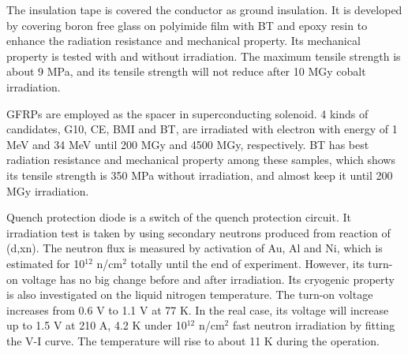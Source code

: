 \documentclass[a4paper, 10pt, twocolumn]{article}
\begin{document}
The insulation tape is covered the conductor as ground insulation.
It is developed by covering boron free glass on polyimide film with BT and epoxy resin to enhance the radiation resistance and mechanical property.
Its mechanical property is tested with and without irradiation.
The maximum tensile strength is about 9 MPa, and its tensile strength will not reduce after 10 MGy cobalt irradiation.

GFRPs are employed as the spacer in superconducting solenoid.
4 kinds of candidates, G10, CE, BMI and BT, are irradiated with electron with energy of 1 MeV and 34 MeV until 200 MGy and 4500 MGy, respectively.
BT has best radiation resistance and mechanical property among these samples, which shows its tensile strength is 350 MPa without irradiation, and almost keep it until 200 MGy irradiation.

Quench protection diode is a switch of the quench protection circuit.
It irradiation test is taken by using secondary neutrons produced from reaction of (d,xn).
The neutron flux is measured by activation of Au, Al and Ni, which is estimated for 10$^{12}$ n/cm$^2$ totally until the end of experiment.
However, its turn-on voltage has no big change before and after irradiation.
Its cryogenic property is also investigated on the liquid nitrogen temperature.
The turn-on voltage increases from 0.6 V to 1.1 V at 77 K.
In the real case, its voltage will increase up to 1.5 V at 210 A, 4.2 K under 10$^{12}$ n/cm$^2$ fast neutron irradiation by fitting the V-I curve.
The temperature will rise to about 11 K during the operation.
\end{document}

